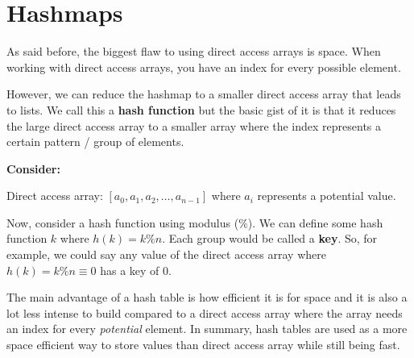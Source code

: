 \documentclass[11pt,a4paper,english]{paper}
\begin{document}
\section{Hashmaps}

As said before, the biggest flaw to using direct access arrays is space. When working with direct access arrays, you have an index for every possible element.

\bigskip
\noindent
However, we can reduce the hashmap to a smaller direct access array that leads to lists. We call this a \textbf{hash function} but the basic gist of it is that it reduces the large direct access array to a smaller array where the index represents a certain pattern / group of elements.

\bigskip
\noindent 
\textbf{Consider:}

\noindent Direct access array: $[ a_0, a_1, a_2, \ldots, a_{n-1} ]$ where $a_i$ represents a potential value.

\bigskip

\noindent Now, consider a hash function using modulus ($\%$). We can define some hash function $k$ where $h(k) = k \% n$. Each group would be called a \textbf{key}. So, for example, we could say any value of the direct access array where $h(k) = k \% n \equiv 0$ has a key of 0.

\bigskip
\noindent
The main advantage of a hash table is how efficient it is for space and it is also a lot less intense to build compared to a direct access array where the array needs an index for every \textit{potential} element. In summary, hash tables are used as a more space efficient way to store values than direct access array while still being fast.
\end{document}
